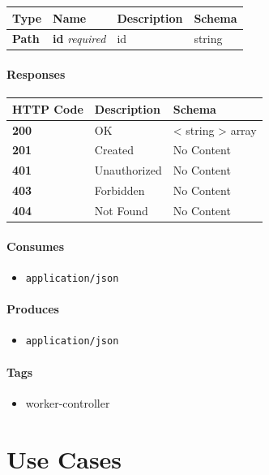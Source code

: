 \begin{longtable}[]{@{}llll@{}}
\toprule
Type & Name & Description & Schema\tabularnewline
\midrule
\endhead
\textbf{Path} & \textbf{id} \emph{required} & id & string\tabularnewline
\bottomrule
\end{longtable}

\subsubsection{Responses}\label{responses-24}

\begin{longtable}[]{@{}lll@{}}
\toprule
HTTP Code & Description & Schema\tabularnewline
\midrule
\endhead
\textbf{200} & OK & \textless{} string \textgreater{}
array\tabularnewline
\textbf{201} & Created & No Content\tabularnewline
\textbf{401} & Unauthorized & No Content\tabularnewline
\textbf{403} & Forbidden & No Content\tabularnewline
\textbf{404} & Not Found & No Content\tabularnewline
\bottomrule
\end{longtable}

\subsubsection{Consumes}\label{consumes-10}

\begin{itemize}
\tightlist
\item
  \texttt{application/json}
\end{itemize}

\subsubsection{Produces}\label{produces-24}

\begin{itemize}
\tightlist
\item
  \texttt{application/json}
\end{itemize}

\subsubsection{Tags}\label{tags-24}

\begin{itemize}
\tightlist
\item
  worker-controller
\end{itemize}

\chapter{Use Cases}\label{use-cases}

